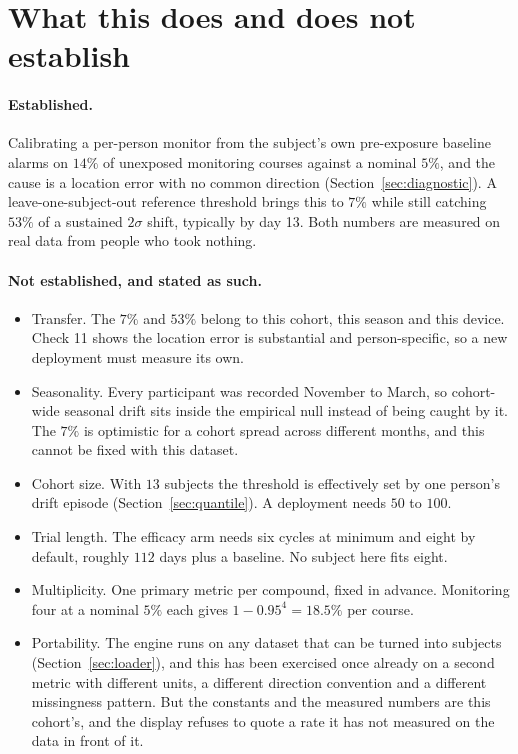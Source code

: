 \documentclass{article}
\theoremstyle{plain}
\theoremstyle{definition}
\theoremstyle{remark}
\numberwithin{equation}{section}
\begin{document}
\section{What this does and does not establish}

\paragraph{Established.} Calibrating a per-person monitor from the subject's
own pre-exposure baseline alarms on $14\%$ of unexposed monitoring courses
against a nominal $5\%$, and the cause is a location error with no common
direction (Section~\ref{sec:diagnostic}). A leave-one-subject-out reference
threshold brings this to $7\%$ while still catching $53\%$ of a sustained
$2\sigma$ shift, typically by day 13. Both numbers are measured on real data
from people who took nothing.

\paragraph{Not established, and stated as such.}
\begin{itemize}[nosep]
  \item Transfer. The $7\%$ and $53\%$ belong to this cohort, this season and
    this device. Check 11 shows the location error is substantial and
    person-specific, so a new deployment must measure its own.
  \item Seasonality. Every participant was recorded November to March, so
    cohort-wide seasonal drift sits inside the empirical null instead of being
    caught by it. The $7\%$ is optimistic for a cohort spread across different
    months, and this cannot be fixed with this dataset.
  \item Cohort size. With $13$ subjects the threshold is effectively set by one
    person's drift episode (Section~\ref{sec:quantile}). A deployment needs
    $50$ to $100$.
  \item Trial length. The efficacy arm needs six cycles at minimum and eight by
    default, roughly $112$ days plus a baseline. No subject here fits eight.
  \item Multiplicity. One primary metric per compound, fixed in advance.
    Monitoring four at a nominal $5\%$ each gives $1-0.95^4 = 18.5\%$ per
    course.
  \item Portability. The engine runs on any dataset that can be turned into
    subjects (Section~\ref{sec:loader}), and this has been exercised once
    already on a second metric with different units, a different direction
    convention and a different missingness pattern. But the constants and the
    measured numbers are this cohort's, and the display refuses to quote a rate
    it has not measured on the data in front of it.
\end{itemize}
\end{document}
